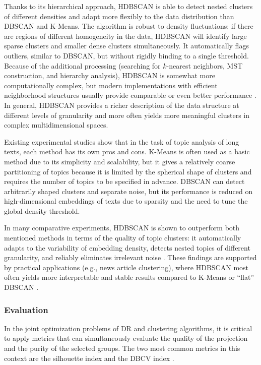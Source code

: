 Thanks to its hierarchical approach, HDBSCAN is able to detect nested clusters of different densities
and adapt more flexibly to the data distribution than DBSCAN and K-Means. The algorithm is robust
to density fluctuations: if there are regions of different homogeneity in the data, HDBSCAN will identify
large sparse clusters and smaller dense clusters simultaneously. It automatically flags outliers, similar
to DBSCAN, but without rigidly binding to a single threshold. Because of the additional processing
(searching for $k$-nearest neighbors, MST construction, and hierarchy analysis), HDBSCAN is somewhat
more computationally complex, but modern implementations with efficient neighborhood structures usually
provide comparable or even better performance \parencite{HDBSCAN2017software}. In general, HDBSCAN
provides a richer description of the data structure at different levels of granularity and more often
yields more meaningful clusters in complex multidimensional spaces.

Existing experimental studies show that in the task of topic analysis of long texts, each method has its
own pros and cons. K-Means is often used as a basic method due to its simplicity and scalability, but
it gives a relatively coarse partitioning of topics because it is limited by the spherical shape
of clusters and requires the number of topics to be specified in advance. DBSCAN can detect arbitrarily
shaped clusters and separate noise, but its performance is reduced on high-dimensional embeddings of texts
due to sparsity and the need to tune the global density threshold.

In many comparative experiments, HDBSCAN is shown to outperform both mentioned methods in terms
of the quality of topic clusters: it automatically adapts to the variability of embedding density, detects
nested topics of different granularity, and reliably eliminates irrelevant noise
\parencite{HDBSCAN2017software, HDBSCAN2013}. These findings are supported by practical applications
(e.g., news article clustering), where HDBSCAN most often yields more interpretable and stable results
compared to K-Means or “flat” DBSCAN \parencite{BERTopic2022}.

\subsubsection{Evaluation}
In the joint optimization problems of DR and clustering algorithms, it is critical
to apply metrics that can simultaneously evaluate the quality of the projection and the purity of the selected
groups. The two most common metrics in this context are the silhouette index \parencite{silouette1987}
and the DBCV index \parencite{dbcv2014density}.


